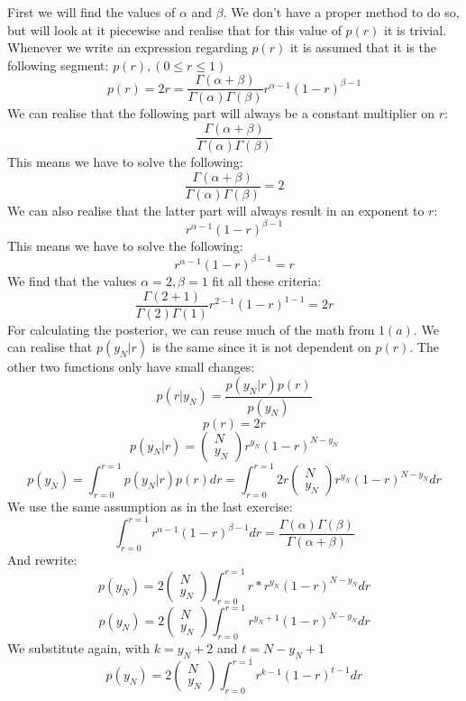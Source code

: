 First we will find the values of $\alpha$ and $\beta$. We don't have a proper method to do so, but will look at it piecewise and realise that for this value of $p(r)$ it is trivial. Whenever we write an expression regarding $p(r)$ it is assumed that it is the following segment: $p(r), (0 \leq r \leq 1)$
$$
p(r) = 2r = \frac{\Gamma(\alpha + \beta)}{\Gamma(\alpha)\Gamma(\beta)} r^{\alpha-1}(1-r)^{\beta-1}
$$
We can realise that the following part will always be a constant multiplier on $r$:
$$
\frac{\Gamma(\alpha + \beta)}{\Gamma(\alpha)\Gamma(\beta)}
$$
This means we have to solve the following:
$$
\frac{\Gamma(\alpha + \beta)}{\Gamma(\alpha)\Gamma(\beta)} = 2
$$
We can also realise that the latter part will always result in an exponent to $r$:
$$
r^{\alpha-1}(1-r)^{\beta-1}
$$
This means we have to solve the following:
$$
r^{\alpha-1}(1-r)^{\beta-1} = r
$$
We find that the values $\alpha = 2,\beta = 1$ fit all these criteria:
$$
\frac{\Gamma(2 + 1)}{\Gamma(2)\Gamma(1)} r^{2-1}(1-r)^{1-1} = 2r
$$
For calculating the posterior, we can reuse much of the math from $1(a)$. We can realise that $p(y_N|r)$ is the same since it is not dependent on $p(r)$. The other two functions only have small changes:
$$
p(r|y_N) = \frac{p(y_N|r)p(r)}{p(y_N)}
$$
$$
p(r) = 2r
$$
$$
p(y_N|r) = \begin{pmatrix} N\\ y_N \end{pmatrix} r^{y_N} (1-r)^{N-y_N}
$$
$$
p(y_N) = \int^{r=1}_{r=0} p(y_N|r)p(r)dr = \int^{r=1}_{r=0} 2r\begin{pmatrix} N\\ y_N \end{pmatrix} r^{y_N} (1-r)^{N-y_N}dr
$$
We use the same assumption as in the last exercise:
$$
\int^{r=1}_{r=0}r^{\alpha-1}(1-r)^{\beta-1}dr = \frac{\Gamma(\alpha)\Gamma(\beta)}{\Gamma(\alpha + \beta)}
$$
And rewrite:
$$
p(y_N) = 2\begin{pmatrix} N\\ y_N \end{pmatrix} \int^{r=1}_{r=0} r * r^{y_N} (1-r)^{N-y_N}dr
$$
$$
p(y_N) = 2\begin{pmatrix} N\\ y_N \end{pmatrix} \int^{r=1}_{r=0} r^{y_N+1} (1-r)^{N-y_N}dr
$$
We substitute again, with $k = y_N+2$ and $t=N-y_N+1$
$$
p(y_N) = 2\begin{pmatrix} N\\ y_N \end{pmatrix} \int^{r=1}_{r=0} r^{k-1} (1-r)^{t-1}dr
$$
